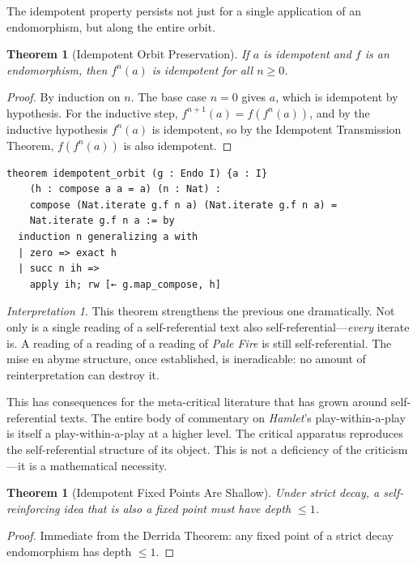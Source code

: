 \documentclass[11pt,openany]{book}
\theoremstyle{definition}
\theoremstyle{plain}
\newtheorem{theorem}[axiom]{Theorem}
\theoremstyle{remark}
\newtheorem{interpretation}[axiom]{Interpretation}
\begin{document}
The idempotent property persists not just for a single application of an endomorphism, but along the entire orbit.

\begin{theorem}[Idempotent Orbit Preservation]
\label{thm:idempotent-orbit}
If $a$ is idempotent and $f$ is an endomorphism, then $f^n(a)$ is idempotent for all $n \geq 0$.
\end{theorem}

\begin{proof}
By induction on $n$. The base case $n = 0$ gives $a$, which is idempotent by hypothesis. For the inductive step, $f^{n+1}(a) = f(f^n(a))$, and by the inductive hypothesis $f^n(a)$ is idempotent, so by the Idempotent Transmission Theorem, $f(f^n(a))$ is also idempotent.
\end{proof}

\begin{lstlisting}[language=Lean4]
theorem idempotent_orbit (g : Endo I) {a : I}
    (h : compose a a = a) (n : Nat) :
    compose (Nat.iterate g.f n a) (Nat.iterate g.f n a) =
    Nat.iterate g.f n a := by
  induction n generalizing a with
  | zero => exact h
  | succ n ih =>
    apply ih; rw [← g.map_compose, h]
\end{lstlisting}

\begin{interpretation}
This theorem strengthens the previous one dramatically. Not only is a single reading of a self-referential text also self-referential---\emph{every} iterate is. A reading of a reading of a reading of \textit{Pale Fire} is still self-referential. The mise en abyme structure, once established, is ineradicable: no amount of reinterpretation can destroy it.

This has consequences for the meta-critical literature that has grown around self-referential texts. The entire body of commentary on \textit{Hamlet}'s play-within-a-play is itself a play-within-a-play at a higher level. The critical apparatus reproduces the self-referential structure of its object. This is not a deficiency of the criticism---it is a mathematical necessity.
\end{interpretation}

\begin{theorem}[Idempotent Fixed Points Are Shallow]
\label{thm:idempotent-fixed-shallow}
Under strict decay, a self-reinforcing idea that is also a fixed point must have depth $\leq 1$.
\end{theorem}

\begin{proof}
Immediate from the Derrida Theorem: any fixed point of a strict decay endomorphism has depth $\leq 1$.
\end{proof}
\end{document}
